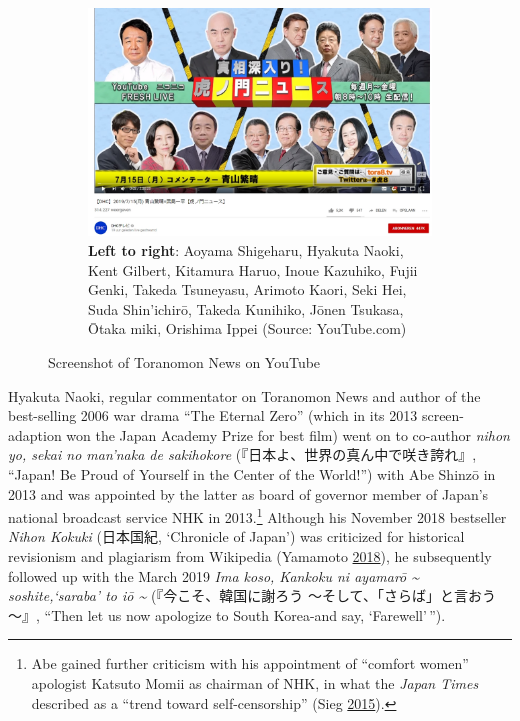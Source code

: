\documentclass[10pt,british,A4paper,twoside]{memoir}
\begin{document}
\begin{figure}[!htb]
 \centering
 \begin{subfigure}[b]{0.5\textwidth}
 \includegraphics[width=\textwidth]{images/2channel/toranomon.jpg} 
 \captionsetup[sub]{font=scriptsize}
 \caption*{\textbf{Left to right}: Aoyama Shigeharu, Hyakuta Naoki, Kent Gilbert, Kitamura Haruo, Inoue Kazuhiko, Fujii Genki, Takeda Tsuneyasu, Arimoto Kaori, Seki Hei, Suda Shin’ichirō, Takeda Kunihiko, Jōnen Tsukasa, Ōtaka miki, Orishima Ippei (Source: YouTube.com)}
 \end{subfigure}
 \caption{Screenshot of Toranomon News on YouTube}\label{fig:toranomon}
\end{figure}

Hyakuta Naoki, regular commentator on Toranomon News and author of the
best-selling 2006 war drama ``The Eternal Zero'' (which in its 2013
screen-adaption won the Japan Academy Prize for best film) went on to
co-author \emph{nihon yo, sekai no man'naka de sakihokore}
(『日本よ、世界の真ん中で咲き誇れ』, ``Japan! Be Proud of Yourself in
the Center of the World!'') with Abe Shinzō in 2013 and was appointed by
the latter as board of governor member of Japan's national broadcast
service NHK in 2013.\footnote{Abe gained further criticism with his
  appointment of ``comfort women'' apologist Katsuto Momii as chairman
  of NHK, in what the \emph{Japan Times} described as a ``trend toward
  self-censorship'' (Sieg
  \protect\hyperlink{ref-sieg_under_2015}{2015}).} Although his November
2018 bestseller \emph{Nihon Kokuki} (日本国紀, `Chronicle of Japan') was
criticized for historical revisionism and plagiarism from Wikipedia
(Yamamoto \protect\hyperlink{ref-yamamoto__2018}{2018}), he subsequently
followed up with the March 2019 \emph{Ima koso, Kankoku ni ayamarō
\textasciitilde{} soshite,`saraba' to iō \textasciitilde{}}
(『今こそ、韓国に謝ろう ～そして、「さらば」と言おう～』, ``Then let us
now apologize to South Korea-and say, `Farewell'\,'').
\end{document}
